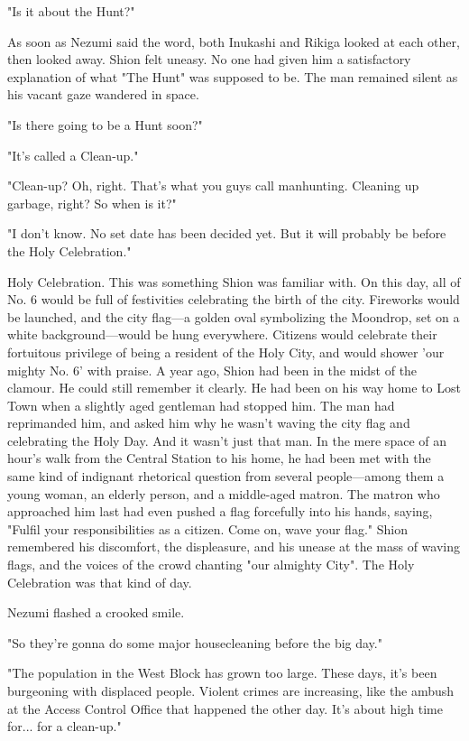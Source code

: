 "Is it about the Hunt?"

As soon as Nezumi said the word, both Inukashi and Rikiga looked at each
other, then looked away. Shion felt uneasy. No one had given him a
satisfactory explanation of what "The Hunt" was supposed to be. The man
remained silent as his vacant gaze wandered in space.

"Is there going to be a Hunt soon?"

"It's called a Clean-up."

"Clean-up? Oh, right. That's what you guys call manhunting. Cleaning up
garbage, right? So when is it?"

"I don't know. No set date has been decided yet. But it will probably be
before the Holy Celebration."

Holy Celebration. This was something Shion was familiar with. On this
day, all of No. 6 would be full of festivities celebrating the birth of
the city. Fireworks would be launched, and the city flag---a golden oval
symbolizing the Moondrop, set on a white background---would be hung
everywhere. Citizens would celebrate their fortuitous privilege of being
a resident of the Holy City, and would shower 'our mighty No. 6' with
praise. A year ago, Shion had been in the midst of the clamour. He could
still remember it clearly. He had been on his way home to Lost Town when
a slightly aged gentleman had stopped him. The man had reprimanded him,
and asked him why he wasn't waving the city flag and celebrating the
Holy Day. And it wasn't just that man. In the mere space of an hour's
walk from the Central Station to his home, he had been met with the same
kind of indignant rhetorical question from several people---among them a
young woman, an elderly person, and a middle-aged matron. The matron who
approached him last had even pushed a flag forcefully into his hands,
saying, "Fulfil your responsibilities as a citizen. Come on, wave your
flag." Shion remembered his discomfort, the displeasure, and his unease
at the mass of waving flags, and the voices of the crowd chanting "our
almighty City". The Holy Celebration was that kind of day.

Nezumi flashed a crooked smile.

"So they're gonna do some major housecleaning before the big day."

"The population in the West Block has grown too large. These days, it's
been burgeoning with displaced people. Violent crimes are increasing,
like the ambush at the Access Control Office that happened the other
day. It's about high time for... for a clean-up."


